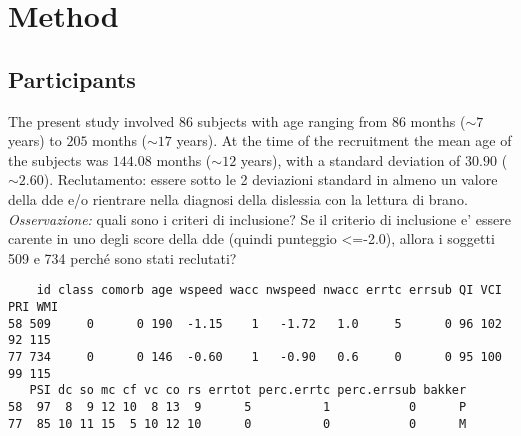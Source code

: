 \documentclass[11pt, a4paper, twoside, openright]{article}
\begin{document}






\section{Method}

\subsection{Participants}
The present study involved $86$ subjects with age ranging from $86$
months ($\sim 7$ years) to $205$ months ($\sim 17$ years). At the time
of the recruitment the mean age of the subjects was $144.08$ months
($\sim 12$ years), with a standard deviation of $30.90$ ($\sim 2.60$).
Reclutamento: essere sotto le 2 deviazioni standard in almeno un
valore della dde e/o rientrare nella diagnosi della dislessia con la
lettura di brano.\\
\emph{Osservazione:} quali sono i criteri di inclusione? Se il
criterio di inclusione e' essere carente in uno degli score della dde
(quindi punteggio <=-2.0), allora i soggetti 509 e 734 perch\'e sono
stati reclutati?
\begin{verbatim}
    id class comorb age wspeed wacc nwspeed nwacc errtc errsub QI VCI PRI WMI
58 509     0      0 190  -1.15    1   -1.72   1.0     5      0 96 102  92 115
77 734     0      0 146  -0.60    1   -0.90   0.6     0      0 95 100  99 115
   PSI dc so mc cf vc co rs errtot perc.errtc perc.errsub bakker
58  97  8  9 12 10  8 13  9      5          1           0      P
77  85 10 11 15  5 10 12 10      0          0           0      M
\end{verbatim}
\end{document}

